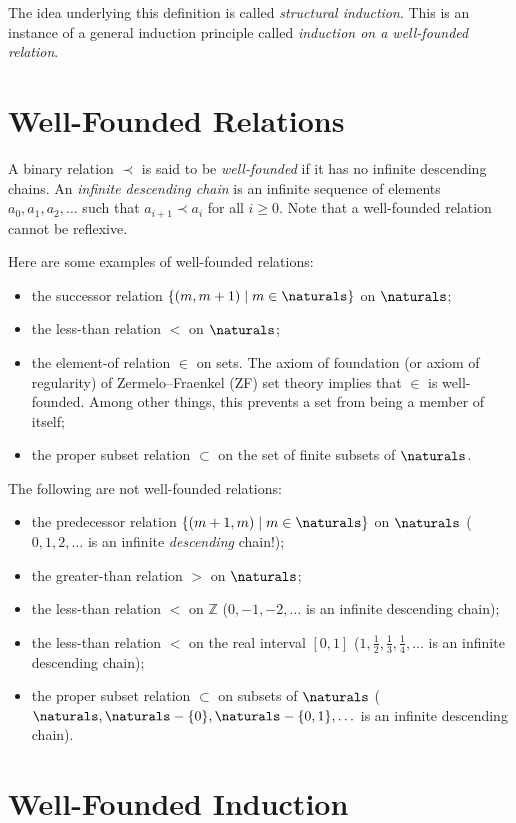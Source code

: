 The idea underlying this definition is called \emph{structural induction}. This is an instance of a general induction principle called \emph{induction on a well-founded relation}.

\section {Well-Founded Relations}

A binary relation $\prec$ is said to be \emph{well-founded} if it has no infinite descending chains. An \emph{infinite descending chain} is an infinite sequence of elements $a_0,a_1,a_2,\ldots$ such that $a_{i+1} \prec a_i$ for all $i\geq 0$. Note that a well-founded relation cannot be reflexive.

Here are some examples of well-founded relations:
\begin{itemize}
\item the successor relation $\{(m,m+1)\mid m\in\naturals\}$ on $\naturals$;
\item the less-than relation $\lt$ on $\naturals$;
\item the element-of relation $\in$ on sets. The axiom of foundation (or axiom of regularity) of Zermelo--Fraenkel (ZF) set theory implies that $\in$ is well-founded. Among other things, this prevents a set from being a member of itself;
\item the proper subset relation $\subset$ on the set of finite subsets of $\naturals$.
\end{itemize}
The following are not well-founded relations:
\begin{itemize}
\item the predecessor relation $\{(m+1,m)\mid m\in\naturals\}$ on $\naturals$ ($0,1,2,\ldots$ is an infinite \emph{descending} chain!);
\item the greater-than relation $\gt$ on $\naturals$;
\item the less-than relation $\lt$ on $\mathbb{Z}$ ($0,-1,-2,\ldots$ is an infinite descending chain);
\item the less-than relation $\lt$ on the real interval $[0,1]$ ($1,\frac 12,\frac 13,\frac 14,\ldots$ is an infinite descending chain);
\item the proper subset relation $\subset$ on subsets of $\naturals$ ($\naturals,\naturals-\{0\},\naturals-\{0,1\},\ldots$ is an infinite descending chain).
\end{itemize}

\section{Well-Founded Induction}

